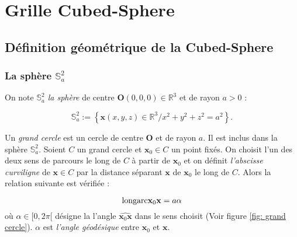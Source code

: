 \chapter{Grille Cubed-Sphere}

\section{Définition géométrique de la Cubed-Sphere}

\subsection{La sphère $\mathbb{S}_a^2$}

On note $\mathbb{S}_a^2$ \textit{la sphère} de centre $\mathbf{O} (0,0,0) \in \mathbb{R}^3$ et de rayon $a>0$ :

\begin{equation}
\mathbb{S}_a^2 := \left\lbrace
\mathbf{x} (x,y,z) \in \mathbb{R}^3 / x^2+y^2+z^2 = a^2
\right\rbrace.
\end{equation} 

Un \textit{grand cercle} est un cercle de centre $\mathbf{O}$ et de rayon $a$. Il est inclus dans la sphère $\mathbb{S}_a^2$.
Soient $C$ un grand cercle et $\mathbf{x}_0 \in C$ un point fixés. On choisit l'un des deux sens de parcours le long de $C$ à partir de $\mathbf{x}_0$ et on définit \textit{l'abscisse curviligne} de $\mathbf{x} \in C$ par la distance séparant $\mathbf{x}$ de $\mathbf{x}_0$ le long de $C$. Alors la relation suivante est vérifiée :

\begin{equation}
\text{longarc}{\mathbf{x}_0  \mathbf{x}} = a \alpha
\end{equation}
où $\alpha \in [ 0, 2 \pi[$ désigne la l'angle $\widehat{\mathbf{x}_0  \mathbf{x}}$ dans le sens choisit (Voir figure \ref{fig: grand cercle}). $\alpha$ est \textit{l'angle géodésique} entre $\mathbf{x}_0$ et $\mathbf{x}$.

